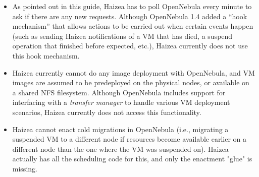 \begin{itemize}
\item As pointed out in this guide, Haizea has to poll OpenNebula every minute to ask if there are any new requests.  Although OpenNebula 1.4 added a ``hook mechanism'' that allows actions to be carried out when certain events happen (such as sending Haizea notifications of a VM that has died, a suspend operation that finished before expected, etc.), Haizea currently does not use this hook mechanism.
\item Haizea currently cannot do any image deployment with OpenNebula, and VM images are assumed to be predeployed on the physical nodes, or available on a shared NFS filesystem. Although OpenNebula includes support for interfacing with a \emph{transfer manager} to handle various VM deployment scenarios, Haizea currently does not access this functionality.
\item Haizea cannot enact cold migrations in OpenNebula (i.e., migrating a suspended VM to a different node if resources become available earlier on a different node than the one where the VM was suspended on). Haizea actually has all the scheduling code for this, and only the enactment "glue" is missing.
\end{itemize}
